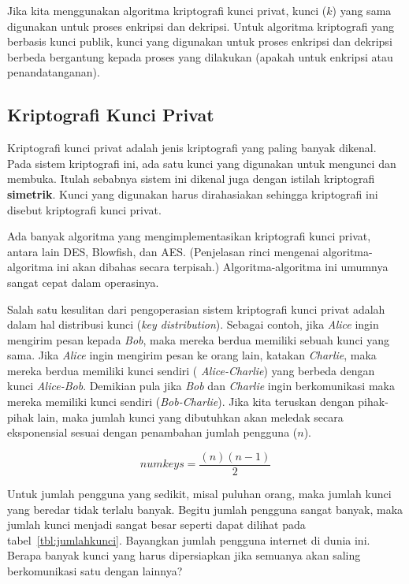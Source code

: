 Jika kita menggunakan algoritma kriptografi kunci privat, kunci ($k$) yang sama
digunakan untuk proses enkripsi dan dekripsi. Untuk algoritma kriptografi yang
berbasis kunci publik, kunci yang digunakan untuk proses enkripsi dan dekripsi
berbeda bergantung kepada proses yang dilakukan (apakah untuk enkripsi atau
penandatanganan).


\subsection{Kriptografi Kunci Privat}
Kriptografi kunci privat adalah jenis kriptografi yang paling banyak dikenal.
Pada sistem kriptografi ini, ada satu kunci yang digunakan untuk mengunci dan
membuka. Itulah sebabnya sistem ini dikenal juga dengan istilah kriptografi
{\bf simetrik}. Kunci yang digunakan harus dirahasiakan sehingga kriptografi
ini disebut kriptografi kunci privat.

Ada banyak algoritma yang mengimplementasikan kriptografi kunci privat, antara
lain DES, Blowfish, dan AES. (Penjelasan rinci mengenai algoritma-algoritma ini
akan dibahas secara terpisah.) Algoritma-algoritma ini umumnya sangat cepat
dalam operasinya.

Salah satu kesulitan dari pengoperasian sistem kriptografi kunci privat adalah
dalam hal distribusi kunci ({\em key distribution}). Sebagai contoh, jika {\em
Alice} ingin mengirim pesan kepada {\em Bob}, maka mereka berdua memiliki
sebuah kunci yang sama. Jika {\em Alice} ingin mengirim pesan ke orang lain,
katakan {\em Charlie}, maka mereka berdua memiliki kunci sendiri ({\em
Alice-Charlie}) yang berbeda dengan kunci {\em Alice-Bob}. Demikian pula jika
{\em Bob} dan {\em Charlie} ingin berkomunikasi maka mereka memiliki kunci
sendiri ({\em Bob-Charlie}). Jika kita teruskan dengan pihak-pihak lain, maka
jumlah kunci yang dibutuhkan akan meledak secara eksponensial sesuai dengan
penambahan jumlah pengguna ($n$).

\begin{equation}
   numkeys = \frac{(n) (n-1)}{2}
\end{equation}

Untuk jumlah pengguna yang sedikit, misal puluhan orang, maka jumlah kunci yang
beredar tidak terlalu banyak. Begitu jumlah pengguna sangat banyak, maka jumlah
kunci menjadi sangat besar seperti dapat dilihat pada
tabel~\ref{tbl:jumlahkunci}. Bayangkan jumlah pengguna internet di dunia ini.
Berapa banyak kunci yang harus dipersiapkan jika semuanya akan saling
berkomunikasi satu dengan lainnya?

